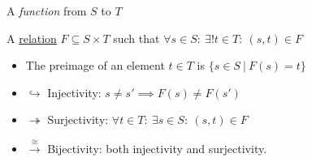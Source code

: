 
A \emph{function} from $S$ to $T$

A \href{doc/1 math/Seven Sketches in Compositionality/1 Chapter 1: Generative Effects/2 What is order/Relation}{relation} $F \subseteq S \times T$ such that $\forall s \in S:\ \exists! t \in T:\ (s,t) \in F$
\begin{itemize}
  \item The preimage of an element $t \in T$ is $\{s \in S\ |\ F(s)=t\}$
  \item $\hookrightarrow$ Injectivity: $s\ne s' \implies F(s)\ne F(s')$
  \item $\twoheadrightarrow$ Surjectivity: $\forall t \in T:\ \exists s \in S:\ (s,t) \in F$
  \item $\xrightarrow \cong$ Bijectivity: both injectivity and surjectivity.
\end{itemize}